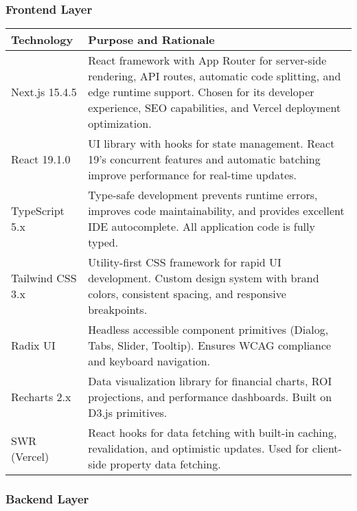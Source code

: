 \documentclass[11pt,a4paper]{article}
\begin{document}
\subsubsection{Frontend Layer}

\begin{longtable}{@{}p{3.5cm}p{11cm}@{}}
\toprule
\textbf{Technology} & \textbf{Purpose and Rationale} \\
\midrule
Next.js 15.4.5 & React framework with App Router for server-side rendering, API routes, automatic code splitting, and edge runtime support. Chosen for its developer experience, SEO capabilities, and Vercel deployment optimization. \\
\addlinespace
React 19.1.0 & UI library with hooks for state management. React 19's concurrent features and automatic batching improve performance for real-time updates. \\
\addlinespace
TypeScript 5.x & Type-safe development prevents runtime errors, improves code maintainability, and provides excellent IDE autocomplete. All application code is fully typed. \\
\addlinespace
Tailwind CSS 3.x & Utility-first CSS framework for rapid UI development. Custom design system with brand colors, consistent spacing, and responsive breakpoints. \\
\addlinespace
Radix UI & Headless accessible component primitives (Dialog, Tabs, Slider, Tooltip). Ensures WCAG compliance and keyboard navigation. \\
\addlinespace
Recharts 2.x & Data visualization library for financial charts, ROI projections, and performance dashboards. Built on D3.js primitives. \\
\addlinespace
SWR (Vercel) & React hooks for data fetching with built-in caching, revalidation, and optimistic updates. Used for client-side property data fetching. \\
\bottomrule
\end{longtable}

\subsubsection{Backend Layer}
\end{document}
